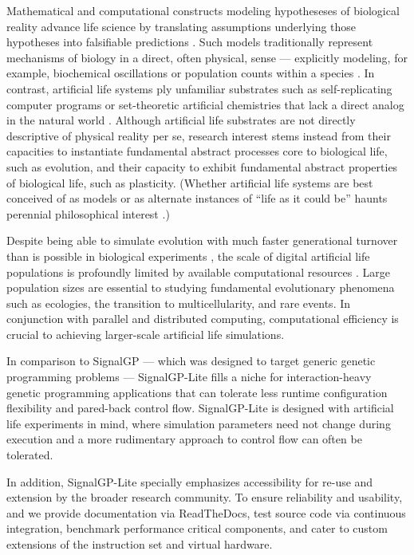 Mathematical and computational constructs modeling hypotheseses of biological reality advance life science by translating assumptions underlying those hypotheses into falsifiable predictions \citep{gunawardena2014models}.
Such models traditionally represent mechanisms of biology in a direct, often physical, sense --- explicitly modeling, for example, biochemical oscillations or population counts within a species \citep{mogilner2006quantitative,schuster2011mathematical}.
In contrast, artificial life systems ply unfamiliar substrates such as self-replicating computer programs or set-theoretic artificial chemistries that lack a direct analog in the natural world \citep{ofria2004avida,dittrich2001artificial}.
Although artificial life substrates are not directly descriptive of physical reality per se, research interest stems instead from their capacities to instantiate fundamental abstract processes core to biological life, such as evolution, and their capacity to exhibit fundamental abstract properties of biological life, such as plasticity.
(Whether artificial life systems are best conceived of as models or as alternate instances of ``life as it could be'' haunts perennial philosophical interest \citep{shanken1998life,pennock2007models}.)

Despite being able to simulate evolution with much faster generational turnover than is possible in biological experiments \citep{ofria2004avida}, the scale of digital artificial life populations is profoundly limited by available computational resources \citep{Moreno_2020}.
Large population sizes are essential to studying fundamental evolutionary phenomena such as ecologies, the transition to multicellularity, and rare events.
In conjunction with parallel and distributed computing, computational efficiency is crucial to achieving larger-scale artificial life simulations.

In comparison to SignalGP --- which was designed to target generic genetic programming problems --- SignalGP-Lite fills a niche for interaction-heavy genetic programming applications that can tolerate less runtime configuration flexibility and pared-back control flow.
SignalGP-Lite is designed with artificial life experiments in mind, where simulation parameters need not change during execution and a more rudimentary approach to control flow can often be tolerated.

In addition, SignalGP-Lite specially emphasizes accessibility for re-use and extension by the broader research community.
To ensure reliability and usability, and we provide documentation via ReadTheDocs, test source code via continuous integration, benchmark performance critical components, and cater to custom extensions of the instruction set and virtual hardware.

